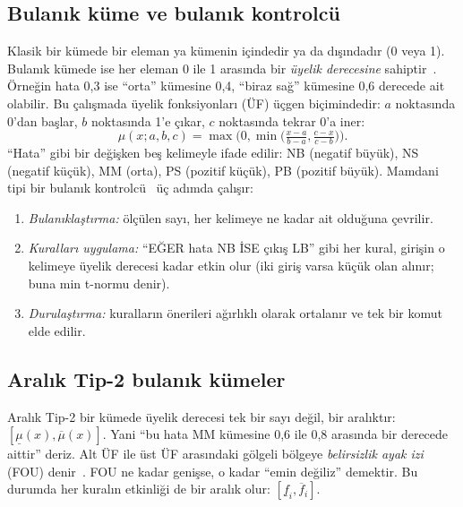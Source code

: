 \documentclass[conference,a4paper]{IEEEtran}
\begin{document}
\subsection{Bulanık küme ve bulanık kontrolcü}
Klasik bir kümede bir eleman ya kümenin içindedir ya da dışındadır (0 veya 1). Bulanık kümede ise her eleman 0 ile 1 arasında bir \emph{üyelik derecesine} sahiptir~\cite{zadeh1965}. Örneğin hata 0,3 ise ``orta'' kümesine 0,4, ``biraz sağ'' kümesine 0,6 derecede ait olabilir. Bu çalışmada üyelik fonksiyonları (ÜF) üçgen biçimindedir: $a$ noktasında 0'dan başlar, $b$ noktasında 1'e çıkar, $c$ noktasında tekrar 0'a iner:
\begin{equation}
\mu(x;a,b,c)=\max\!\Big(0,\min\Big(\tfrac{x-a}{b-a},\tfrac{c-x}{c-b}\Big)\Big).
\end{equation}
``Hata'' gibi bir değişken beş kelimeyle ifade edilir: NB (negatif büyük), NS (negatif küçük), MM (orta), PS (pozitif küçük), PB (pozitif büyük). Mamdani tipi bir bulanık kontrolcü~\cite{mamdani1975} üç adımda çalışır:
\begin{enumerate}
\item \emph{Bulanıklaştırma:} ölçülen sayı, her kelimeye ne kadar ait olduğuna çevrilir.
\item \emph{Kuralları uygulama:} ``EĞER hata NB İSE çıkış LB'' gibi her kural, girişin o kelimeye üyelik derecesi kadar etkin olur (iki giriş varsa küçük olan alınır; buna min t-normu denir).
\item \emph{Durulaştırma:} kuralların önerileri ağırlıklı olarak ortalanır ve tek bir komut elde edilir.
\end{enumerate}

\subsection{Aralık Tip-2 bulanık kümeler}
Aralık Tip-2 bir kümede üyelik derecesi tek bir sayı değil, bir aralıktır: $[\underline{\mu}(x),\overline{\mu}(x)]$. Yani ``bu hata MM kümesine 0,6 ile 0,8 arasında bir derecede aittir'' deriz. Alt ÜF ile üst ÜF arasındaki gölgeli bölgeye \emph{belirsizlik ayak izi} (FOU) denir~\cite{mendel2002}. FOU ne kadar genişse, o kadar ``emin değiliz'' demektir. Bu durumda her kuralın etkinliği de bir aralık olur: $[\underline{f}_i,\overline{f}_i]$.
\end{document}
